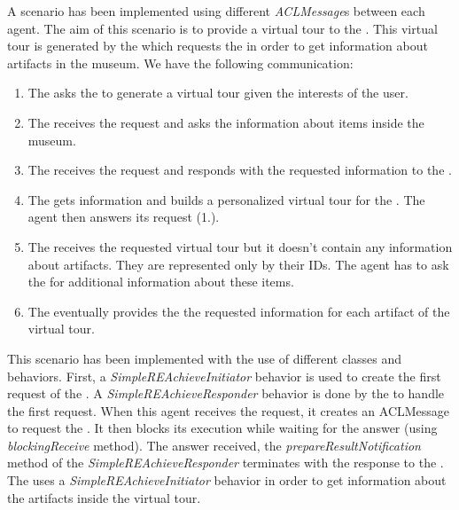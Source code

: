\documentclass[a4paper,11pt]{article}
\begin{document}
  A scenario has been implemented using different \textit{ACLMessage}s between each agent. The aim of this scenario is to provide a virtual tour to the \pa{}. This 
  virtual tour is generated by the \to{} which requests the \cu{} in order to get information about artifacts in the museum. We have the following communication:
  \begin{enumerate}
   \item The \pa{} asks the \to{} to generate a virtual tour given the interests of the user.
   \item The \to{} receives the request and asks the \cu{} information about items inside the museum.
   \item The \cu{} receives the request and responds with the requested information to the \to{}.
   \item The \to{} gets information and builds a personalized virtual tour for the \cu{}. The agent then answers its request (1.).
   \item The \pa{} receives the requested virtual tour but it doesn't contain any information about artifacts. They are represented only by their IDs. The agent has to ask 
   the \cu{} for additional information about these items.
   \item The \cu{} eventually provides the \pa{} the requested information for each artifact of the virtual tour.
  \end{enumerate}
  
  This scenario has been implemented with the use of different classes and behaviors. First, a \textit{SimpleREAchieveInitiator} behavior is used to create the 
  first request of the \pa{}. A \textit{SimpleREAchieveResponder} behavior is done by the \to{} to handle the first request. When this agent receives the request, 
  it creates an ACLMessage to request the \cu{}. It then blocks its execution while waiting for the answer (using \textit{blockingReceive} method). The answer received, 
  the \textit{prepareResultNotification} method of the \textit{SimpleREAchieveResponder} terminates with the response to the \pa{}. The \pa{} uses a \textit{SimpleREAchieveInitiator} 
  behavior in order to get information about the artifacts inside the virtual tour.

  
% 
% 
\end{document}
